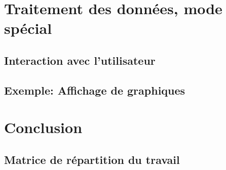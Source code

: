 \documentclass[a4paper]{article}
\begin{document}
\newpage
\section{Traitement des données, mode spécial}
	
	\subsection{Interaction avec l'utilisateur}
		
	\subsection{Exemple: Affichage de graphiques}
		


\newpage

\section{Conclusion}
	
	\subsection{Matrice de répartition du travail}
		

\appendix
\end{document}
